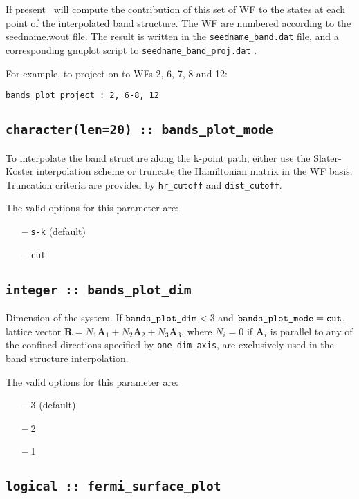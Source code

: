 If present \wannier\ will compute the contribution of this set of WF to the
states at each point of the interpolated band structure.
The WF are numbered according to the seedname.wout file. The result is written 
in the {\tt seedname\_band.dat} file, and a corresponding gnuplot script to
{\tt seedname\_band\_proj.dat} .

 For example, to project on to WFs 2, 6, 7, 8 and 12:

 \verb#bands_plot_project : 2, 6-8, 12#


\subsection[bands\_plot\_mode]{\tt character(len=20) :: bands\_plot\_mode}

To interpolate the band structure along the k-point path,
either use the Slater-Koster interpolation scheme
or truncate the Hamiltonian matrix in the WF basis. 
Truncation criteria are provided by \verb#hr_cutoff#
and \verb#dist_cutoff#. 

The valid options for this parameter are:
\begin{itemize}
\item[{\bf --}] \verb#s-k# (default)
\item[{\bf --}] \verb#cut#
\end{itemize}

\subsection[bands\_plot\_dim]{\tt integer :: bands\_plot\_dim}

Dimension of the system.
If $\verb#bands_plot_dim#<\:$3 and $\verb#bands_plot_mode#=\verb#cut#$,
lattice vector $\mathbf{R}=N_1 \mathbf{A}_{1} + N_2 \mathbf{A}_{2} + N_3 \mathbf{A}_3$,
where $N_i=0$ if $\mathbf{A}_i$ is parallel to any of the
confined directions specified by \verb#one_dim_axis#,
are exclusively used in the band structure interpolation.

The valid options for this parameter are:
\begin{itemize}
\item[{\bf --}] 3 (default)
\item[{\bf --}] 2
\item[{\bf --}] 1
\end{itemize}


\subsection[fermi\_surface\_plot]{\tt logical :: fermi\_surface\_plot}

